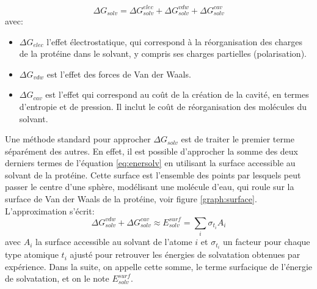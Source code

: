 \begin{equation}
  \label{eq:enersolv}
  \Delta G_{solv} = \Delta G_{solv}^{elec} + \Delta G_{solv}^{vdw} + \Delta G_{solv}^{cav}
\end{equation}
avec:

\begin{itemize}
\item $\Delta G_{elec}$ l'effet électrostatique, qui correspond à la réorganisation des charges de la protéine dans le solvant, y compris ses charges partielles (polarisation).
\item $\Delta G_{vdw}$ est l'effet des forces de Van der Waals.
\item $\Delta G_{cav}$ est l'effet qui correspond au coût de la création de la cavité, en termes d'entropie et de pression. Il inclut le coût de réorganisation des molécules du solvant.
\end{itemize}

Une méthode standard pour approcher $\Delta G_{solv}$ est de traiter le premier terme séparément des autres. En effet, il est possible d'approcher la somme des deux derniers termes de l'équation  \ref{eq:enersolv} en utilisant la surface accessible au solvant de la protéine. Cette surface est l'ensemble des points par lesquels peut passer le centre d'une sphère, modélisant une molécule d'eau, qui roule sur la surface de Van der Waals de la protéine, voir figure \ref{graph:surface}. L'approximation s'écrit:
\begin{equation}
  \label{eq:SA}
\Delta G_{solv}^{vdw} + \Delta G_{solv}^{cav} \approx E_{solv}^{surf} = \sum_i \sigma_{t_i} A_i
\end{equation}
avec $A_i$ la surface accessible au solvant de l'atome $i$  et $\sigma_{t_i}$ un facteur pour chaque type atomique $t_i$ ajusté pour retrouver les énergies de solvatation obtenues par expérience.
Dans la suite, on appelle cette somme, le terme surfacique de l'énergie de solvatation, et on le note $E_{solv}^{surf}$.

